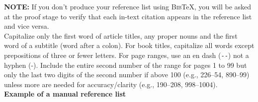 \documentclass{cje}          %
\theoremstyle{plain}%
\theoremstyle{definition}
\theoremstyle{remark}
\begin{document}
\noindent \textbf{NOTE:} If you don't produce your reference list using \textsc{Bib}\TeX, you will be asked at the proof stage to verify that each in-text citation appears in the reference list and vice versa.
\\

Capitalize only the first word of article titles, any proper nouns and the first word of a subtitle (word after a colon). For book titles, capitalize all words except prepositions of three or fewer letters. For page ranges, use an en dash (\verb"--") not a hyphen (-). Include the entire second number of the range for pages 1 to 99 but only the last two digits of the second number if above 100 (e.g., 226--54, 890--99) unless more are needed for accuracy/clarity (e.g., 190--208, 998--1004).\\

\noindent \textbf{Example of a manual reference list}
\end{document}
